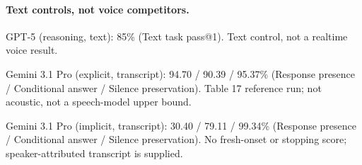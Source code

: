\paragraph{Text controls, not voice competitors.}
GPT-5 (reasoning, text): 85\% (Text task pass@1). Text control, not a realtime voice result. \citep{tauvoice}\par
Gemini 3.1 Pro (explicit, transcript): 94.70 / 90.39 / 95.37\% (Response presence / Conditional answer / Silence preservation). Table 17 reference run; not acoustic, not a speech-model upper bound. \citep{mpe}\par
Gemini 3.1 Pro (implicit, transcript): 30.40 / 79.11 / 99.34\% (Response presence / Conditional answer / Silence preservation). No fresh-onset or stopping score; speaker-attributed transcript is supplied. \citep{mpe}\par
